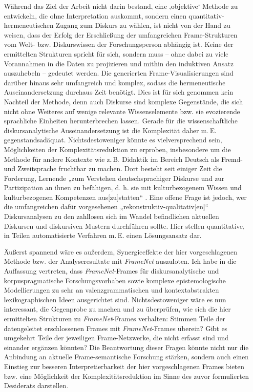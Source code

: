 Während das Ziel der Arbeit nicht darin bestand, eine ‚objektive` Methode zu entwickeln, die ohne Interpretation auskommt, sondern einen quantitativ-hermeneutischen Zugang zum Diskurs zu wählen, ist nicht von der Hand zu weisen, dass der Erfolg der Erschließung der umfangreichen Frame-Strukturen vom Welt- bzw. Diskurswissen der Forschungsperson abhängig ist. Keine der ermittelten Strukturen spricht für sich, sondern muss -- ohne dabei zu viele Vorannahmen in die Daten zu projizieren und mithin den induktiven Ansatz auszuhebeln -- gedeutet werden. Die generierten Frame-Visualisierungen sind darüber hinaus sehr umfangreich und komplex, sodass die hermeneutische Auseinandersetzung durchaus Zeit benötigt. Dies ist für sich genommen kein Nachteil der Methode, denn auch Diskurse sind komplexe Gegenstände, die sich nicht ohne Weiteres auf wenige relevante Wissenselemente bzw. sie evozierende sprachliche Einheiten herunterbrechen lassen. Gerade für die wissenschaftliche diskursanalytische Auseinandersetzung ist die Komplexität daher m.\,E. gegenstandsadäquat. Nichtsdestoweniger könnte es vielversprechend sein, Möglichkeiten der Komplexitätsreduktion zu erproben, insbesondere um die Methode für andere Kontexte wie z.\,B. Didaktik im Bereich Deutsch als Fremd- und Zweitsprache fruchtbar zu machen. Dort besteht seit einiger Zeit die Forderung, Lernende „zum Verstehen deutschsprachiger Diskurse und zur Partizipation an ihnen zu befähigen, d. h. sie mit kulturbezogenem Wissen und kulturbezogenen Kompetenzen aus{[}zu{]}statten`` \autocite[184]{altmayerLandeskundeAlsKulturwissenschaft2006}. Eine offene Frage ist jedoch, wer die umfangreichen dafür vorgesehenen „rekonstruktiv-qualitativ{[}en{]}`` \autocite[191]{altmayerLandeskundeAlsKulturwissenschaft2006} Diskursanalysen zu den zahllosen sich im Wandel befindlichen aktuellen Diskursen und diskursiven Mustern durchführen sollte. Hier stellen quantitative, in Teilen automatisierte Verfahren m.\,E. einen Lösungsansatz dar.

Äußerst spannend wäre es außerdem, Synergieeffekte der hier vorgeschlagenen Methode bzw. der Analyseresultate mit \emph{FrameNet} auszuloten. Ich habe in  die Auffassung vertreten, dass \emph{FrameNet}-Frames für diskursanalytische und korpuspragmatische Forschungsvorhaben sowie komplexe epistemologische Modellierungen zu sehr an valenzgrammatischen und kontextabstrakten lexikographischen Ideen ausgerichtet sind. Nichtsdestoweniger wäre es nun interessant, die Gegenprobe zu machen und zu überprüfen, wie sich die hier ermittelten Strukturen zu \emph{FrameNet}-Frames verhalten: Stimmen Teile der datengeleitet erschlossenen Frames mit \emph{FrameNet}-Frames überein? Gibt es umgekehrt Teile der jeweiligen Frame-Netzwerke, die nicht erfasst sind und einander ergänzen könnten? Die Beantwortung dieser Fragen könnte nicht nur die Anbindung an aktuelle Frame-semantische Forschung stärken, sondern auch einen Einstieg zur besseren Interpretierbarkeit der hier vorgeschlagenen Frames bieten bzw. eine Möglichkeit der Komplexitätsreduktion im Sinne des zuvor formulierten Desiderats darstellen.

